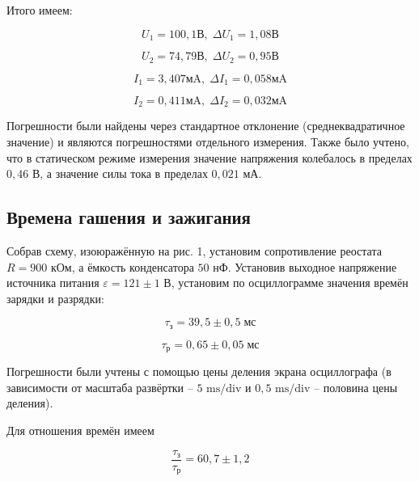 Итого имеем:

\begin{equation}
    U_1 = 100,1 \text{В}, \; \Delta  U_1 = 1,08 \text{В}
\end{equation}

\begin{equation}
    U_2 = 74,79 \text{В}, \; \Delta  U_2 = 0,95 \text{В}
\end{equation}

\begin{equation}
    I_1 = 3,407 \text{мA}, \; \Delta  I_1 = 0,058 \text{мA}
\end{equation}

\begin{equation}
    I_2 = 0,411 \text{мA}, \; \Delta  I_2 = 0,032 \text{мA}
\end{equation}

Погрешности были найдены через стандартное отклонение (среднеквадратичное значение) и являются погрешностями отдельного измерения. Также было учтено, что в статическом режиме измерения значение напряжения колебалось в пределах $0,46$ В, а значение силы тока в пределах $0,021$ мА.

\subsection{Времена гашения и зажигания}

Собрав схему, изоюражённую на рис. 1, установим сопротивление реостата $R = 900$ кОм, а ёмкость конденсатора $50$ нФ. Установив выходное напряжение источника питания $\varepsilon = 121 \pm 1$ В, установим по осциллограмме значения времён зарядки и разрядки:

\begin{equation}
    \tau_{\text{з}} = 39,5 \pm 0,5 \; \text{мс}
\end{equation}

\begin{equation}
    \tau_{\text{р}} = 0,65 \pm 0,05 \; \text{мс}
\end{equation}

Погрешности были учтены с помощью цены деления экрана осциллографа (в зависимости от масштаба развёртки -- $5$ $\text{ms/div}$ и $0,5$ $\text{ms/div}$ -- половина цены деления).

Для отношения времён имеем

\begin{equation}
    \frac{\tau_{\text{з}}}{\tau_{\text{р}}} = 60,7 \pm 1,2
\end{equation}


